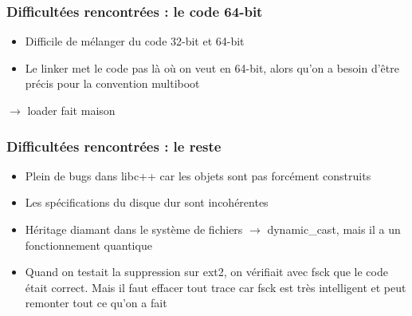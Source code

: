 \documentclass{beamer}
\begin{document}
\begin{frame}
    \frametitle{Difficultées rencontrées : le code 64-bit}
    \begin{itemize}
        \item Difficile de mélanger du code 32-bit et 64-bit
        \item Le linker met le code pas là où on veut en 64-bit, alors qu'on a besoin d'être précis pour la convention multiboot
    \end{itemize}
    $\rightarrow$ loader fait maison
\end{frame}

\begin{frame}
    \frametitle{Difficultées rencontrées : le reste}
    \begin{itemize}
        \item Plein de bugs dans libc++ car les objets sont pas forcément construits
        \item Les spécifications du disque dur sont incohérentes
        \item Héritage diamant dans le système de fichiers $\rightarrow$ dynamic\_cast, mais il a un fonctionnement quantique
        \item Quand on testait la suppression sur ext2, on vérifiait avec fsck que le code était correct. Mais il faut effacer tout trace car fsck est très intelligent et peut remonter tout ce qu'on a fait
    \end{itemize}
\end{frame}
\end{document}
